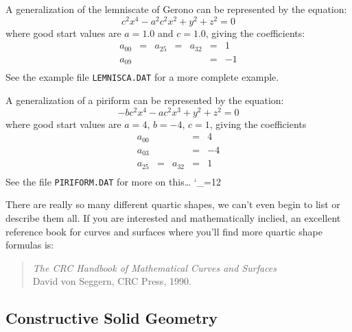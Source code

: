 A generalization of the lemniscate of Gerono can be represented by the
equation:
\begin{displaymath}
c^{2}x^{4} - a^{2}c^{2}x^{2} + y^{2} + z^{2} = 0
\end{displaymath}
where good start values are $a = 1.0$ and $c = 1.0$, giving the
coefficients:
\begin{displaymath}
\begin{array}{ccccccl}
a_{00} & = & a_{25} & = & a_{32} & = & 1 \\
a_{09} &   &        &   &        & = & -1 \\
\end{array}
\end{displaymath}
See the example file {\tt LEMNISCA.DAT} for a more complete example.

A generalization of a piriform can be represented by the
equation:
\begin{displaymath}
-bc^{2}x^{4} - ac^{2}x^{3} + y^{2} + z^{2} = 0
\end{displaymath}
where good start values are $a = 4$, $b = -4$, $c = 1$, giving the
coefficients
\begin{displaymath}
\begin{array}{ccccl}
a_{00} &   &        & = & 4 \\
a_{03} &   &        & = & -4 \\
a_{25} & = & a_{32} & = & 1 \\
\end{array}
\end{displaymath}
See the file {\tt PIRIFORM.DAT} for more on this\ldots
\catcode`\_=12

There are really so many different quartic shapes, we can't even begin to
list or describe them all.  If you are interested and mathematically inclied,
an excellent reference book for curves and surfaces where you'll find more
quartic shape formulas is:
\begin{verse}
{\em The CRC Handbook of Mathematical Curves and Surfaces} \\
David von Seggern, CRC Press, 1990.
\end{verse}

\subsection{Constructive Solid Geometry}


